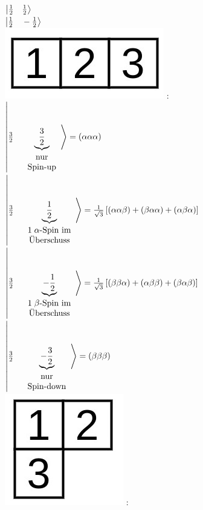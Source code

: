 \documentclass[12pt,a4paper]{article}
\begin{document}
$ \ket{\frac{1}{2} \quad\frac{1}{2}}$ \\

$ \ket{\frac{1}{2} \quad-\frac{1}{2}}$ \\



\newpage
\includegraphics[scale=0.6]{build/young-123.jpg} : \\

$ \ket{\frac{3}{2}\quad \underbrace{\frac{3}{2}}_{\begin{array}{c}
\text{nur} \\ \text{Spin-up}
\end{array}}} = (\alpha \alpha \alpha )$ \\

$ \ket{\frac{3}{2}\quad \underbrace{\frac{1}{2}}_{\begin{array}{c}
1\;\alpha \text{-Spin im}  \\ \text{Überschuss}
\end{array} }} = \frac{1}{\sqrt{3}} \left[
 \left( \alpha \alpha \beta \right) +  \left( \beta \alpha \alpha \right) +  
 \left(    \alpha\beta \alpha \right) 
  \right]$ \\
  
$ \ket{\frac{3}{2}\quad \underbrace{-\frac{1}{2}}_{\begin{array}{c}
1\;\beta \text{-Spin im}  \\ \text{Überschuss}
\end{array} }} = \frac{1}{\sqrt{3}} \left[
 \left(\beta\beta \alpha \right) +  \left(  \alpha\beta \beta\right) +  
 \left(    \beta \alpha \beta\right) 
  \right]$ \\

$ \ket{\frac{3}{2}\quad \underbrace{-\frac{3}{2}}_{\begin{array}{c}
\text{nur} \\ \text{Spin-down}
\end{array}}} = (\beta \beta \beta )$ \\

\includegraphics[scale=0.6]{build/young-12.jpg} : \\
\end{document}
